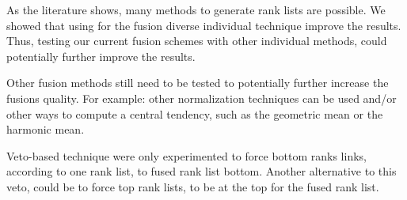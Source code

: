 As the literature shows, many methods to generate rank lists are possible.
We showed that using for the fusion diverse individual technique improve the results.
Thus, testing our current fusion schemes with other individual methods, could potentially further improve the results.

Other fusion methods still need to be tested to potentially further increase the fusions quality.
For example: other normalization techniques can be used and/or other ways to compute a central tendency, such as the geometric mean or the harmonic mean.

Veto-based technique were only experimented to force bottom ranks links, according to one rank list, to fused rank list bottom.
Another alternative to this veto, could be to force top rank lists, to be at the top for the fused rank list.
